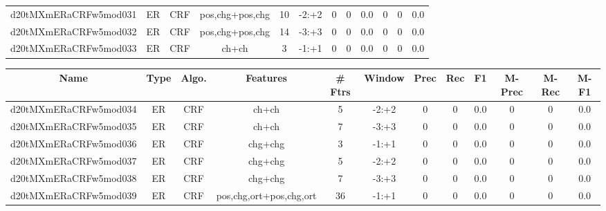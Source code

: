 \documentclass[a4paper]{article}
\begin{document}
\begin{landscape}
\begin{center}
\begin{tabular}{ |c|c|c|c|c|c|c|c|c|c|c|c|}
 
 	
 	\small{ d20tMXmERaCRFw5mod031 } & ER & CRF & pos,chg+pos,chg  &  10 &  -2:+2  &  0 & 0 & 0.0  &  0 & 0 & 0.0 \\
 	

 
 	
 	\small{ d20tMXmERaCRFw5mod032 } & ER & CRF & pos,chg+pos,chg  &  14 &  -3:+3  &  0 & 0 & 0.0  &  0 & 0 & 0.0 \\
 	

 
 	
 	\small{ d20tMXmERaCRFw5mod033 } & ER & CRF & ch+ch  &  3 &  -1:+1  &  0 & 0 & 0.0  &  0 & 0 & 0.0 \\
 	
 \hline
\end{tabular}
\end{center}




\begin{center}
\begin{tabular}{ |c|c|c|c|c|c|c|c|c|c|c|c|} 
 \hline
 	Name & Type & Algo. & Features & \# Ftrs & Window & Prec & Rec & F1 & M-Prec & M-Rec & M-F1\\
 \hline

 	

 
 	
 	\small{ d20tMXmERaCRFw5mod034 } & ER & CRF & ch+ch  &  5 &  -2:+2  &  0 & 0 & 0.0  &  0 & 0 & 0.0 \\
 	

 
 	
 	\small{ d20tMXmERaCRFw5mod035 } & ER & CRF & ch+ch  &  7 &  -3:+3  &  0 & 0 & 0.0  &  0 & 0 & 0.0 \\
 	

 
 	
 	\small{ d20tMXmERaCRFw5mod036 } & ER & CRF & chg+chg  &  3 &  -1:+1  &  0 & 0 & 0.0  &  0 & 0 & 0.0 \\
 	

 
 	
 	\small{ d20tMXmERaCRFw5mod037 } & ER & CRF & chg+chg  &  5 &  -2:+2  &  0 & 0 & 0.0  &  0 & 0 & 0.0 \\
 	

 
 	
 	\small{ d20tMXmERaCRFw5mod038 } & ER & CRF & chg+chg  &  7 &  -3:+3  &  0 & 0 & 0.0  &  0 & 0 & 0.0 \\
 	

 
 	
 	\small{ d20tMXmERaCRFw5mod039 } & ER & CRF & pos,chg,ort+pos,chg,ort  &  36 &  -1:+1  &  0 & 0 & 0.0  &  0 & 0 & 0.0 \\
 	


\end{tabular}
\end{center}
\end{landscape}
\end{document}

